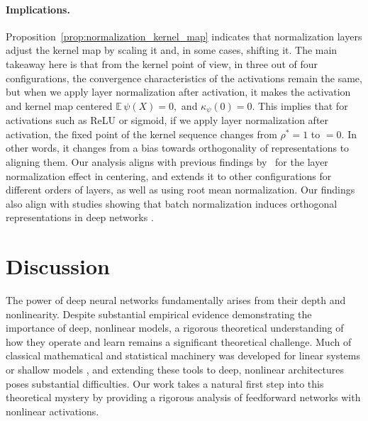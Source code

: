 \documentclass[twoside]{article}
\newcommand{\E}{\mathbb{E}\,}
\theoremstyle{definition}
\begin{document}
\paragraph{Implications.} Proposition~\ref{prop:normalization_kernel_map} indicates that normalization layers adjust the kernel map by scaling it and, in some cases, shifting it. The main takeaway here is that from the kernel point of view, in three out of four configurations, the convergence characteristics of the activations remain the same, but when we apply layer normalization after activation, it makes the activation and kernel map centered $\E \psi(X) = 0,$ and $\kappa_\psi(0)=0$. This implies that for activations such as ReLU or sigmoid, if we apply layer normalization after activation, the fixed point of the kernel sequence changes from $\rho^*=1$ to $=0. $ In other words, it changes from a bias towards orthogonality of representations to aligning them. Our analysis aligns with previous findings by~\citet{joudaki2023impact} for the layer normalization effect in centering, and extends it to other configurations for different orders of layers, as well as using root mean normalization. Our findings also align with studies showing that batch normalization induces orthogonal representations in deep networks \citep{yang2019meanfield,daneshmand2021batch}.


\section{Discussion}
The power of deep neural networks fundamentally arises from their depth and nonlinearity. Despite substantial empirical evidence demonstrating the importance of deep, nonlinear models, a rigorous theoretical understanding of how they operate and learn remains a significant theoretical challenge. Much of classical mathematical and statistical machinery was developed for linear systems or shallow models \citep{hastie2009elements}, and extending these tools to deep, nonlinear architectures poses substantial difficulties. Our work takes a natural first step into this theoretical mystery by providing a rigorous analysis of feedforward networks with nonlinear activations. 
\end{document}
